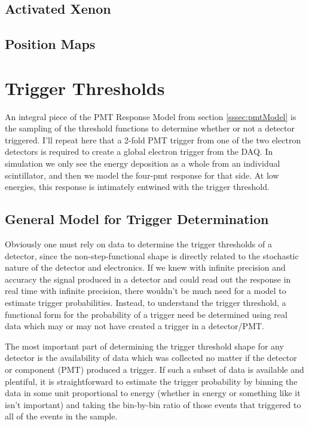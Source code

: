\subsection{Activated Xenon}


\subsection{Position Maps}


\section{Trigger Thresholds}
An integral piece of the PMT Response Model from section \ref{sssec:pmtModel} 
is the sampling of the threshold functions to determine whether or not a detector
triggered. I'll repeat here that a 2-fold PMT trigger from one of the two electron
detectors is required to create a global electron trigger from the DAQ. In simulation
we only see the energy deposition as a whole from an individual scintillator, and then
we model the four-pmt response for that side. At low energies, this response is 
intimately entwined with the trigger threshold.

\subsection{General Model for Trigger Determination}
Obviously one must rely on data to determine the trigger thresholds of a detector, since
the non-step-functional shape is directly related to the stochastic nature of the detector and  
electronics. If we knew with infinite precision and accuracy the signal produced in a detector
and could read out the response in real time with infinite precision, there wouldn't be much
need for a model to estimate trigger probabilities. Instead, to understand the trigger threshold, a functional 
form for the probability of a trigger need be determined using real data which may or 
may not have created a trigger in a detector/PMT. 

The most important part of determining the trigger threshold shape for any detector is the 
availability of data which was collected no matter if the detector or component (PMT) produced 
a trigger. If such a subset of data is available and plentiful, it is straightforward to estimate
the trigger probability by binning the data in some unit proportional to energy (whether in energy
or something like it isn't important) and taking the bin-by-bin ratio of those events that triggered to 
all of the events in the sample. 

